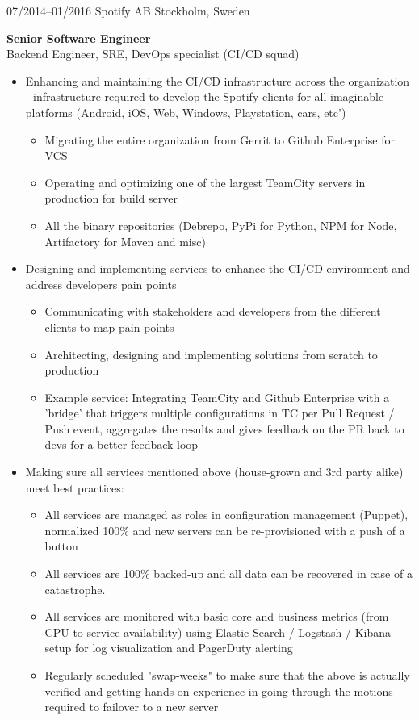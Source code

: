 \documentclass[]{friggeri-cv} %
\begin{document}
\begin{entrylist}
\entry
{07/2014--01/2016}
{Spotify AB}
{Stockholm, Sweden}
{\textbf{Senior Software Engineer} \\
Backend Engineer, SRE, DevOps specialist (CI/CD squad)
\begin{itemize}
\item Enhancing and maintaining the CI/CD infrastructure across the organization - infrastructure required to develop the Spotify clients for all imaginable platforms (Android, iOS, Web, Windows, Playstation, cars, etc')
\begin{itemize}
\item Migrating the entire organization from Gerrit to Github Enterprise for VCS
\item Operating and optimizing one of the largest TeamCity servers in production for build server
\item All the binary repositories (Debrepo, PyPi for Python, NPM for Node, Artifactory for Maven and misc) 
\end{itemize}
\item Designing and implementing services to enhance the CI/CD environment and address developers pain points
\begin{itemize}
\item Communicating with stakeholders and developers from the different clients to map pain points
\item Architecting, designing and implementing solutions from scratch to production
\item Example service: Integrating TeamCity and Github Enterprise with a 'bridge' that triggers multiple configurations in TC per Pull Request / Push event, aggregates the results and gives feedback on the PR back to devs for a better feedback loop
\end {itemize}
\item Making sure all services mentioned above (house-grown and 3rd party alike) meet best practices:
\begin{itemize}
\item All services are managed as roles in configuration management (Puppet), normalized 100\% and new servers can be re-provisioned with a push of a button
\item All services are 100\% backed-up and all data can be recovered in case of a catastrophe.
\item All services are monitored with basic core and business metrics (from CPU to service availability) using Elastic Search / Logstash / Kibana setup for log visualization and PagerDuty alerting
\item Regularly scheduled "swap-weeks" to make sure that the above is actually verified and getting hands-on experience in going through the motions required to failover to a new server
\end{itemize}
\end{itemize}}
\\
\end{entrylist}
\end{document}
